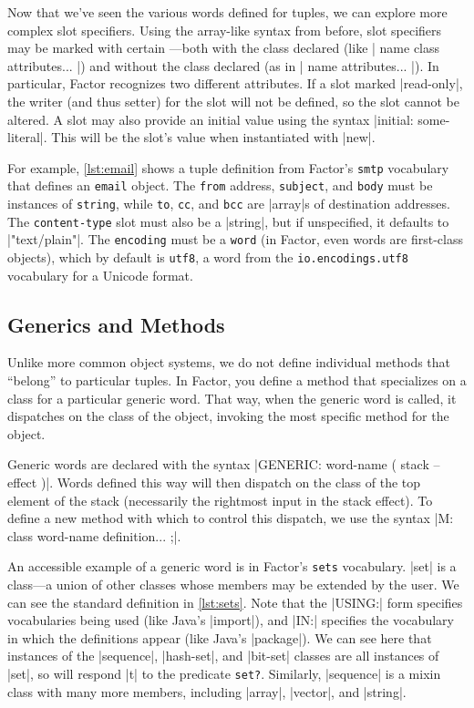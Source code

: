 
Now that we've seen the various words defined for tuples, we can explore more
complex slot specifiers.  Using the array-like syntax from before, slot
specifiers may be marked with certain ---both with the class
declared (like
%
\factor|{ name class attributes... }|)
%
and without the class declared (as in 
%
\factor|{ name attributes... }|).
%
In particular, Factor recognizes two different attributes.  If a slot marked
\factor|read-only|, the writer (and thus setter) for the slot will not be
defined, so the slot cannot be altered.  A slot may also provide an initial
value using the syntax \factor|initial: some-literal|.  This will be the slot's
value when instantiated with \factor|new|. 

For example, \cref{lst:email} shows a tuple definition from Factor's
\Verb|smtp| vocabulary that defines an \Verb|email| object.  The
\Verb|from| address, \Verb|subject|, and \Verb|body| must be instances of
\Verb|string|, while \Verb|to|, \Verb|cc|, and \Verb|bcc| are
\factor|array|s of destination addresses.  The \Verb|content-type| slot must
also be a \factor|string|, but if unspecified, it defaults to
\factor|"text/plain"|.  The \Verb|encoding| must be a \Verb|word| (in
Factor, even words are first-class objects), which by default is \Verb|utf8|,
a word from the \Verb|io.encodings.utf8| vocabulary for a Unicode format.

\subsection{Generics and Methods}

Unlike more common object systems, we do not define individual methods that
``belong'' to particular tuples.  In Factor, you define a method that
specializes on a class for a particular generic word.  That way, when the
generic word is called, it dispatches on the class of the object, invoking the
most specific method for the object.

Generic words are declared with the syntax
%
\factor|GENERIC: word-name ( stack -- effect )|.
%
Words defined this way will then dispatch on the class of the top element of
the stack (necessarily the rightmost input in the stack effect).  To define a
new method with which to control this dispatch, we use the syntax
%
\factor|M: class word-name definition... ;|.


An accessible example of a generic word is in Factor's \Verb|sets|
vocabulary.  \factor|set| is a  class---a union of other classes
whose members may be extended by the user.  We can see the standard definition
in \cref{lst:sets}.  Note that the \factor|USING:| form specifies vocabularies
being used (like Java's |import|), and \factor|IN:| specifies the
vocabulary in which the definitions appear (like Java's |package|).
We can see here that instances of the \factor|sequence|, \factor|hash-set|, and
\factor|bit-set| classes are all instances of \factor|set|, so will respond
\factor|t| to the predicate \Verb|set?|.  Similarly, \factor|sequence| is a
mixin class with many more members, including \factor|array|, \factor|vector|,
and \factor|string|.


